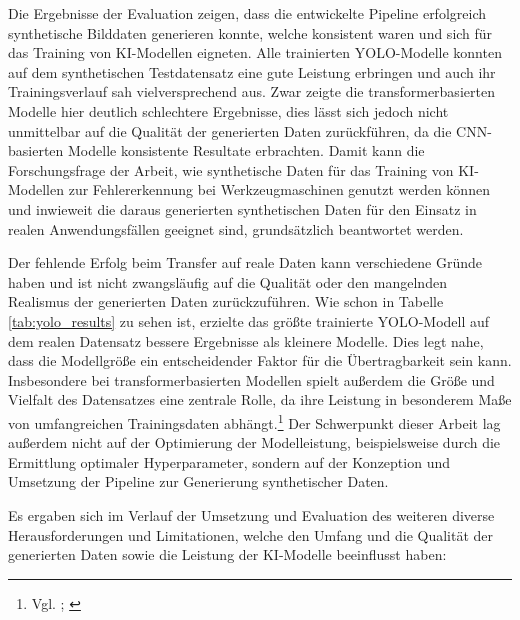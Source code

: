 Die Ergebnisse der Evaluation zeigen, dass die entwickelte Pipeline erfolgreich synthetische Bilddaten generieren konnte, welche konsistent waren und sich für das Training von \ac{KI}-Modellen eigneten. Alle trainierten \ac{YOLO}-Modelle konnten auf dem synthetischen Testdatensatz eine gute Leistung erbringen und auch ihr Trainingsverlauf sah vielversprechend aus. Zwar zeigte die transformerbasierten Modelle hier deutlich schlechtere Ergebnisse, dies lässt sich jedoch nicht unmittelbar auf die Qualität der generierten Daten zurückführen, da die CNN-basierten Modelle konsistente Resultate erbrachten. Damit kann die Forschungsfrage der Arbeit, wie synthetische Daten für das Training von \ac{KI}-Modellen zur Fehlererkennung bei Werkzeugmaschinen genutzt werden können und inwieweit die daraus generierten synthetischen Daten für den Einsatz in realen Anwendungsfällen geeignet sind, grundsätzlich beantwortet werden.

Der fehlende Erfolg beim Transfer auf reale Daten kann verschiedene Gründe haben und ist nicht zwangsläufig auf die Qualität oder den mangelnden Realismus der generierten Daten zurückzuführen. Wie schon in Tabelle \ref{tab:yolo_results} zu sehen ist, erzielte das größte trainierte \ac{YOLO}-Modell auf dem realen Datensatz bessere Ergebnisse als kleinere Modelle. Dies legt nahe, dass die Modellgröße ein entscheidender Faktor für die Übertragbarkeit sein kann. Insbesondere bei transformerbasierten Modellen spielt außerdem die Größe und Vielfalt des Datensatzes eine zentrale Rolle, da ihre Leistung in besonderem Maße von umfangreichen Trainingsdaten abhängt.\footnote{Vgl. \cite[8]{jamil_comprehensive_2022}; \cite[209]{berroukham_vision_2023}} Der Schwerpunkt dieser Arbeit lag außerdem nicht auf der Optimierung der Modelleistung, beispielsweise durch die Ermittlung optimaler Hyperparameter, sondern auf der Konzeption und Umsetzung der Pipeline zur Generierung synthetischer Daten.

Es ergaben sich im Verlauf der Umsetzung und Evaluation des weiteren diverse Herausforderungen und Limitationen, welche den Umfang und die Qualität der generierten Daten sowie die Leistung der \ac{KI}-Modelle beeinflusst haben:

